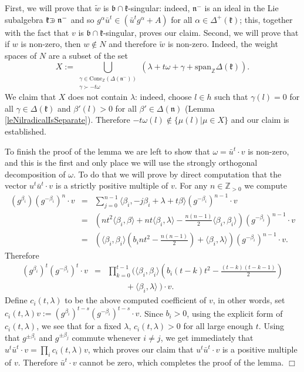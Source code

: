 \documentclass[12pt]{report}
\newcommand {\ZZ} {\mathbb {Z}}
\newcommand{\kk}{\mathfrak{k}}
\newcommand{\nn}{\mathfrak{n}}
\newcommand{\bb}{\mathfrak{b}}
\newcommand{\linspan}{\mathrm{span}}
\newcommand{\Cone}{\mathrm{Cone}}
\def\crplus{\hbox{$\supset${\raise1.05pt\hbox{\kern -0.60em ${\scriptscriptstyle +}$}}\ }}
\newcommand{\pma}{\pm}%
\begin{document}
First, we will prove that $\tilde w$ is $\bb\cap\kk$-singular: indeed, $\nn^-$ is an ideal in the Lie subalgebra $\kk\crplus\nn^-$ and so $g^{\alpha} \bar u^t \in\left( \bar u^t g^{\alpha}+A\right)$ for all $\alpha \in \Delta^+(\kk)$; this, together with the fact that $v$ is $\bb\cap\kk$-singular, proves our claim. Second, we will prove that if $w$ is non-zero, then $w\notin N$ and therefore $\tilde w$ is non-zero. Indeed, the weight spaces of $N$ are a subset of the set 
\[
X:=\bigcup_{\substack{ \gamma\in\Cone_{\ZZ}(\Delta(\nn^-)) \\ \gamma\succ-t\omega }}(\lambda+t\omega+\gamma+ \linspan_\ZZ{ \Delta( \kk)} ).
\]
We claim that $X$ does not contain $\lambda$: indeed, choose $l\in h$ such that $\gamma(l)=0$ for all $\gamma\in\Delta(\kk)$ and $\beta'(l)>0$ for all $\beta'\in\Delta(\nn)$ (Lemma \ref{leNilradicalIsSeparate}). Therefore $-t\omega(l)\notin \{\mu(l)| \mu\in X\}$ and our claim is established.

To finish the proof of the lemma we are left to show that $\omega=\bar u^{t}\cdot v$ is non-zero, and this is the first and only place we will use the strongly orthogonal decomposition of $\omega$. To do that we will prove by direct computation that the vector $u^{t}\bar u^{t}\cdot v$ is a strictly positive multiple of $v$. For any $n\in\ZZ_{>0}$ we compute
\begin{eqnarray*}
(g^{\beta_i}) (g^{-\beta_i})^{n} \cdot v&=& \sum_{j=0}^{n-1} \langle\beta_i,-j\beta_i+\lambda+t\beta \rangle (g^{-\beta_i})^{n-1}\cdot v\\
&=&\left(nt^2\langle\beta_i,\beta\rangle+nt\langle\beta_i,\lambda\rangle - \frac{n(n-1)}{2}\langle\beta_i,\beta_i\rangle \right)(g^{-\beta_i})^{n-1}\cdot v\\
&=& \left(\langle\beta_i, \beta_i\rangle\left(b_int^2-\frac{n(n-1)}{2}\right)+ \langle\beta_i,\lambda\rangle\right) (g^{ - \beta_i })^{n-1}\cdot v .
\end{eqnarray*}
Therefore
\begin{eqnarray*}
(g^{\beta_i})^{t} (g^{-\beta_i})^{t}\cdot v&=&\prod_{k=0}^{t-1}\Bigg(  \langle\beta_i, \beta_i \rangle \left(b_i(t-k)t^2-\frac{(t-k)(t-k-1)}{2}\right)\\ &&~~~~~~~~~~+ \langle\beta_i,\lambda\rangle ~ \Bigg)\cdot v.
\end{eqnarray*}
Define $c_i(t,\lambda)$ to be the above computed coefficient of $ v$, in other words, set $ c_i(t,\lambda) v:= (g^{\beta_i})^{t-s} (g^{-\beta_i})^{t-s}\cdot v$. Since $b_i>0$, using the explicit form of $c_i(t,\lambda)$, we see that for a fixed $\lambda$, $c_i(t,\lambda)>0$ for all large enough $t$. Using that $g^{\pma\beta_i}$ and $g^{\pma\beta_j}$ commute whenever $i\neq j$, we get immediately that $u^{t}\bar u^{t}\cdot v=\prod_i c_i(t,\lambda) v$, which proves our claim that $u^{t}\bar u^{t}\cdot v$ is  a positive multiple of $v$. Therefore $\bar u^{t}\cdot v$ cannot be zero, which completes the proof of the lemma.
$\Box$
\end{document}
